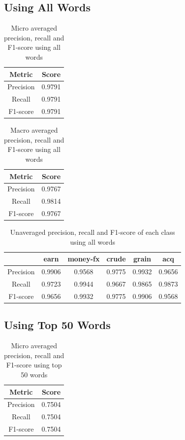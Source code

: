 \documentclass{article}
\begin{document}
\subsection{Using All Words}

\begin{table}[H]
	\caption{Micro averaged precision, recall and F1-score using all words}
	\centering
	\begin{tabular}{|c|c|}
		\hline
		Metric & Score \\
		\hline
		Precision & 0.9791 \\
		\hline
		Recall & 0.9791 \\
		\hline
		F1-score & 0.9791 \\
		\hline
	\end{tabular}
\end{table}

\begin{table}[H]
	\caption{Macro averaged precision, recall and F1-score using all words}
	\centering
	\begin{tabular}{|c|c|}
		\hline
		Metric & Score \\
		\hline
		Precision & 0.9767 \\
		\hline
		Recall & 0.9814 \\
		\hline
		F1-score & 0.9767 \\
		\hline
	\end{tabular}
\end{table}

\begin{table}[H]
	\caption{Unaveraged precision, recall and F1-score of each class using all words}
	\centering
	\begin{tabular}{|c|c|c|c|c|c|}
		\hline
		& earn & money-fx & crude & grain & acq \\
		\hline
		Precision & 0.9906 & 0.9568 & 0.9775 & 0.9932 & 0.9656 \\
		\hline
		Recall & 0.9723 & 0.9944 & 0.9667 & 0.9865 & 0.9873 \\
		\hline
		F1-score & 0.9656 & 0.9932 & 0.9775 & 0.9906 & 0.9568 \\
		\hline
	\end{tabular}
\end{table}

\subsection{Using Top 50 Words}

\begin{table}[H]
	\caption{Micro averaged precision, recall and F1-score using top 50 words}
	\centering
	\begin{tabular}{|c|c|}
		\hline
		Metric & Score \\
		\hline
		Precision & 0.7504 \\
		\hline
		Recall & 0.7504 \\
		\hline
		F1-score & 0.7504 \\
		\hline
	\end{tabular}
\end{table}
\end{document}
